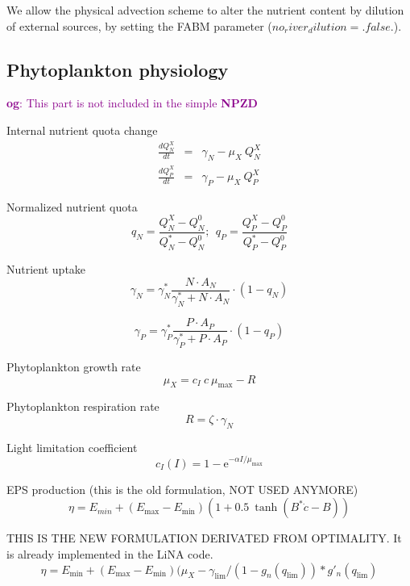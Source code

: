 \documentclass[fleqn]{article}                     %
\newcommand{\comment}[3][darkmagenta]{\textcolor{#1}{\textbf{#2}: #3}}
\begin{document}
We allow the physical advection scheme to alter the nutrient content by dilution of external sources, by setting the FABM parameter ($no_river_dilution=.false.$).

\subsection{Phytoplankton physiology}
\comment{og}{This part is not included in the simple \textbf{NPZD}}

Internal nutrient quota change
\begin{eqnarray}
  \frac{dQ^X_N}{dt} &=&  \gamma_N - \mu_X \  Q^X_N \\
  \frac{dQ^X_P}{dt} &=&  \gamma_P- \mu_X \  Q^X_P
\end{eqnarray}

Normalized nutrient quota
\begin{equation}
  q_N = \frac{Q^X_N-Q^0_N}{Q^*_N-Q^0_N};\ \ q_P = \frac{Q^X_P-Q^0_P}{Q^*_P-Q^0_P}
\end{equation}

Nutrient uptake
\begin{equation}
  \gamma_N = \gamma^*_N \frac{N \cdot A_N}{\gamma^*_N+ N \cdot A_N} \cdot (1-q_N)
\end{equation}

\begin{equation}
  \gamma_P = \gamma^*_P \frac{P \cdot A_P}{\gamma^*_P + P \cdot A_P} \cdot (1-q_P)
\end{equation}

Phytoplankton growth rate
\begin{equation}
  \mu_X= c_I\  c\  \mu_{\text{max}} - R
\end{equation}

Phytoplankton respiration rate
\begin{equation}
  R = \zeta \cdot \gamma_N
\end{equation}

Light limitation coefficient
\begin{equation}
  c_I(I) = 1-\textrm{e}^{-\alpha I/ \mu_{\text{max}}}
\end{equation}

EPS production (this is the old formulation, NOT USED ANYMORE)
\begin{equation}
  \eta = E_{min} + (E_{\textrm{max}}-E_{\textrm{min}})(1+0.5\ \tanh(B^*\dot{c}-B))
\end{equation}

THIS IS THE NEW FORMULATION DERIVATED FROM OPTIMALITY.
It is already implemented in the LiNA code.
\begin{equation}
  \eta = E_{\textrm{min}} + (E_{\textrm{max}}-E_{\textrm{min}})(\mu_X-\gamma_{\lim}/(1-g_n(q_{\lim}))*g'_n(q_{\lim})
\end{equation}
\end{document}
